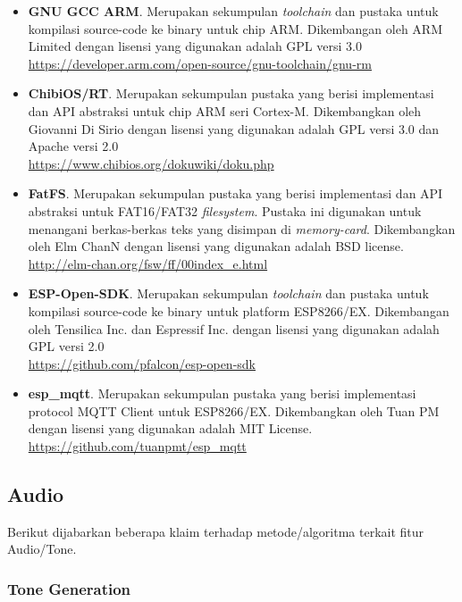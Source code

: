 \documentclass[12pt,]{article}
\begin{document}
	\begin{itemize}
		\item \textbf{GNU GCC ARM}. Merupakan sekumpulan \textit{toolchain} dan pustaka untuk kompilasi source-code ke binary untuk chip ARM.
		Dikembangan oleh ARM Limited dengan lisensi yang digunakan adalah GPL versi 3.0\\
		\url{https://developer.arm.com/open-source/gnu-toolchain/gnu-rm}
		
		\item \textbf{ChibiOS/RT}. Merupakan sekumpulan pustaka yang berisi implementasi dan API abstraksi untuk chip ARM seri Cortex-M.
		Dikembangkan oleh Giovanni Di Sirio dengan lisensi yang digunakan adalah GPL versi 3.0 dan Apache versi 2.0\\
		\url{https://www.chibios.org/dokuwiki/doku.php}
		
		\item \textbf{FatFS}. Merupakan sekumpulan pustaka yang berisi implementasi dan API abstraksi untuk FAT16/FAT32 \textit{filesystem}.
		Pustaka ini digunakan untuk menangani berkas-berkas teks yang disimpan di \textit{memory-card}.
		Dikembangkan oleh Elm ChanN dengan lisensi yang digunakan adalah BSD license.\\
		\url{http://elm-chan.org/fsw/ff/00index_e.html}
		
		\item \textbf{ESP-Open-SDK}. Merupakan sekumpulan \textit{toolchain} dan pustaka untuk kompilasi source-code ke binary untuk platform ESP8266/EX.
		Dikembangan oleh Tensilica Inc. dan Espressif Inc. dengan lisensi yang digunakan adalah GPL versi 2.0\\
		\url{https://github.com/pfalcon/esp-open-sdk}
		
		\item \textbf{esp\_mqtt}. Merupakan sekumpulan pustaka yang berisi implementasi protocol MQTT Client untuk ESP8266/EX.
		Dikembangkan oleh Tuan PM dengan lisensi yang digunakan adalah MIT License.\\
		\url{https://github.com/tuanpmt/esp_mqtt}
	\end{itemize}

	\subsection{Audio}
	
	Berikut dijabarkan beberapa klaim terhadap metode/algoritma terkait fitur Audio/Tone.
	
	\subsubsection{Tone Generation}
	
\end{document}
